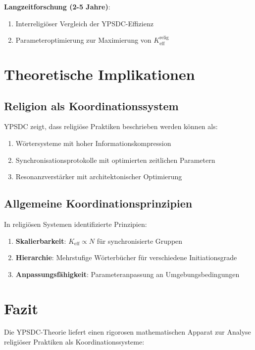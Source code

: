 \documentclass[12pt,a4paper]{article}
\begin{document}
	\textbf{Langzeitforschung (2-5 Jahre)}:
	\begin{enumerate}
		\item Interreligiöser Vergleich der YPSDC-Effizienz
		\item Parameteroptimierung zur Maximierung von $K_{\mathrm{eff}}^{\mathrm{relig}}$
	\end{enumerate}
	
	\section{Theoretische Implikationen}
	
	\subsection{Religion als Koordinationssystem}
	
	YPSDC zeigt, dass religiöse Praktiken beschrieben werden können als:
	\begin{enumerate}
		\item Wörtersysteme mit hoher Informationskompression
		\item Synchronisationsprotokolle mit optimierten zeitlichen Parametern
		\item Resonanzverstärker mit architektonischer Optimierung
	\end{enumerate}
	
	\subsection{Allgemeine Koordinationsprinzipien}
	
	In religiösen Systemen identifizierte Prinzipien:
	\begin{enumerate}
		\item \textbf{Skalierbarkeit}: $K_{\mathrm{eff}} \propto N$ für synchronisierte Gruppen
		\item \textbf{Hierarchie}: Mehrstufige Wörterbücher für verschiedene Initiationsgrade
		\item \textbf{Anpassungsfähigkeit}: Parameteranpassung an Umgebungsbedingungen
	\end{enumerate}
	
	\section{Fazit}
	
	Die YPSDC-Theorie liefert einen rigorosen mathematischen Apparat zur Analyse religiöser Praktiken als Koordinationssysteme:
	
\end{document}
